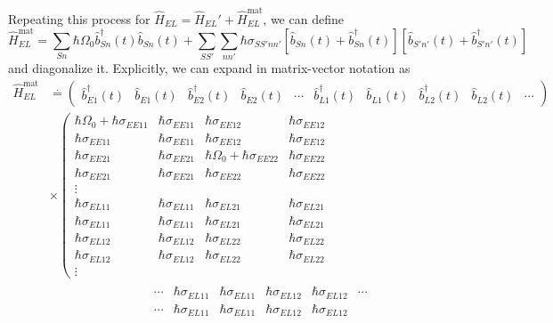 \documentclass{article}
\begin{document}
Repeating this process for $\hat{H}_{EL} = \hat{H}_{EL}' + \hat{H}_{EL}^\mathrm{mat}$, we can define
\begin{equation}
\hat{H}_{EL}^\mathrm{mat} = \sum_{Sn}\hbar\Omega_0\hat{b}_{Sn}^\dagger(t)\hat{b}_{Sn}(t) + \sum_{SS'}\sum_{nn'}\hbar\sigma_{SS'nn'}\left[\hat{b}_{Sn}(t) + \hat{b}_{Sn}^\dagger(t)\right]\left[\hat{b}_{S'n'}(t) + \hat{b}_{S'n'}^\dagger(t)\right]
\end{equation}
and diagonalize it. Explicitly, we can expand in matrix-vector notation as
\begin{equation}
\begin{split}
\hat{H}_{EL}^\mathrm{mat} &\overset{.}{=} 
\begin{pmatrix}
\hat{b}_{E1}^\dagger(t) & \hat{b}_{E1}(t) & \hat{b}_{E2}^\dagger(t) & \hat{b}_{E2}(t) & \cdots & \hat{b}_{L1}^\dagger(t) & \hat{b}_{L1}(t) & \hat{b}_{L2}^\dagger(t) & \hat{b}_{L2}(t) & \cdots
\end{pmatrix}\\
&\times\left(
\begin{matrix}
\hbar\Omega_0 + \hbar\sigma_{EE11} & \hbar\sigma_{EE11} & \hbar\sigma_{EE12} & \hbar\sigma_{EE12}\\ 
\hbar\sigma_{EE11} & \hbar\sigma_{EE11} & \hbar\sigma_{EE12} & \hbar\sigma_{EE12}\\
\hbar\sigma_{EE21} & \hbar\sigma_{EE21} & \hbar\Omega_0 + \hbar\sigma_{EE22} & \hbar\sigma_{EE22}\\
\hbar\sigma_{EE21} & \hbar\sigma_{EE21} & \hbar\sigma_{EE22} & \hbar\sigma_{EE22}\\
\vdots & & & \\
\hbar\sigma_{EL11} & \hbar\sigma_{EL11} & \hbar\sigma_{EL21} & \hbar\sigma_{EL21}\\
\hbar\sigma_{EL11} & \hbar\sigma_{EL11} & \hbar\sigma_{EL21} & \hbar\sigma_{EL21}\\
\hbar\sigma_{EL12} & \hbar\sigma_{EL12} & \hbar\sigma_{EL22} & \hbar\sigma_{EL22}\\
\hbar\sigma_{EL12} & \hbar\sigma_{EL12} & \hbar\sigma_{EL22} & \hbar\sigma_{EL22}\\
\vdots & & &
\end{matrix}
\right.\\
&\qquad\qquad\qquad\qquad\left.
\begin{matrix}
\cdots & \hbar\sigma_{EL11} & \hbar\sigma_{EL11} & \hbar\sigma_{EL12} & \hbar\sigma_{EL12} & \cdots\\
\cdots & \hbar\sigma_{EL11} & \hbar\sigma_{EL11} & \hbar\sigma_{EL12} & \hbar\sigma_{EL12} &\\

\end{matrix}
\end{split}
\end{equation}
\end{document}
